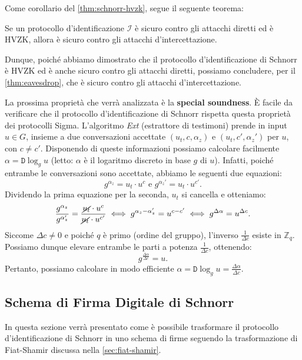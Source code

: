 Come corollario del \autoref{thm:schnorr-hvzk}, segue il seguente teorema:

\begin{theorem}\label{thm:eavesdrop}
	Se un protocollo d'identificazione $\mathcal{I}$ è sicuro contro gli attacchi diretti ed è HVZK, allora è sicuro contro gli attacchi d'intercettazione.
\end{theorem}

Dunque, poiché abbiamo dimostrato che il protocollo d'identificazione di Schnorr è HVZK ed è anche sicuro contro gli attacchi diretti, possiamo concludere, per il \autoref{thm:eavesdrop}, che è sicuro contro gli attacchi d'intercettazione.

\begin{silentproof}  
	La prossima proprietà che verrà analizzata è la \textbf{special soundness}. È facile da verificare che il protocollo d'identificazione di Schnorr rispetta questa proprietà dei protocolli Sigma.
	L'algoritmo \textit{Ext} (estrattore di testimoni) prende in input $u \in G$, insieme a due conversazioni accettate $(u_t, c, \alpha_z)$ e $(u_t, c', \alpha_z')$ per $u$, con $c \neq c'$. Disponendo di queste informazioni possiamo calcolare facilmente $\alpha = \texttt{D}\log_gu$ (letto: $\alpha$ è il logaritmo discreto in base $g$ di $u$). Infatti, poiché entrambe le conversazioni sono accettate, abbiamo le seguenti due equazioni:
	\[
		g^{\alpha_z} = u_t \cdot u^c \text{ e } g^{\alpha_z'} = u_t \cdot u^{c'}.
	\]
	Dividendo la prima equazione per la seconda, $u_t$ si cancella e otteniamo:
	\[
		\frac{g^{\alpha_z}}{g^{\alpha_z'}} = \frac{\cancel{u_t} \cdot u^c}{\cancel{u_t} \cdot u^{c'}} \iff g^{\alpha_z - \alpha_z'} = u^{c - c'} \iff g^{\Delta\alpha} = u^{\Delta c}.
	\]
	Siccome $\Delta c \neq 0$ e poiché $q$ è primo (ordine del gruppo), l'inverso $\frac{1}{\Delta c}$ esiste in $\mathbb{Z}_q$. Possiamo dunque elevare entrambe le parti a potenza $\frac{1}{\Delta c}$, ottenendo:
	\[
		g^{\frac{\Delta\alpha}{\Delta c}} = u.
	\]
	Pertanto, possiamo calcolare in modo efficiente $\alpha = \texttt{D}\log_gu = \frac{\Delta\alpha}{\Delta c}$.
\end{silentproof}

\newpage

\subsection{Schema di Firma Digitale di Schnorr}\label{sec:sig_schnorr}

In questa sezione verrà presentato come è possibile trasformare il protocollo d'identificazione di Schnorr in uno schema di firme seguendo la trasformazione di Fiat-Shamir discussa nella \autoref{sec:fiat-shamir}.

